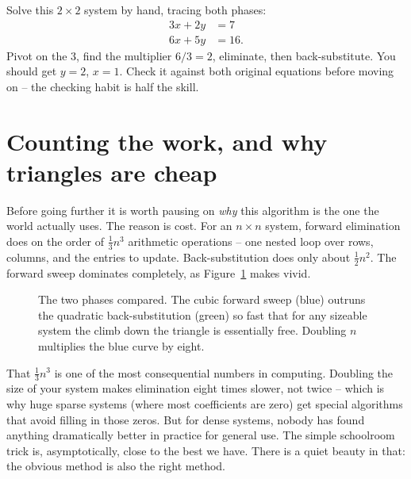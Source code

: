 \begin{labbox}
Solve this $2\times 2$ system by hand, tracing both phases:
\[
\begin{aligned}
3x + 2y &= 7\\
6x + 5y &= 16.
\end{aligned}
\]
Pivot on the $3$, find the multiplier $6/3 = 2$, eliminate, then back-substitute.
You should get $y = 2$, $x = 1$. Check it against both original equations before
moving on -- the checking habit is half the skill.
\end{labbox}

\section{Counting the work, and why triangles are cheap}

Before going further it is worth pausing on \emph{why} this algorithm is the one
the world actually uses. The reason is cost. For an $n\times n$ system, forward
elimination does on the order of $\tfrac13 n^3$ arithmetic operations -- one
nested loop over rows, columns, and the entries to update. Back-substitution
does only about $\tfrac12 n^2$. The forward sweep dominates completely, as
Figure~\ref{ch07:cost} makes vivid.

\begin{figure}[H]
\centering
{}
\caption{The two phases compared. The cubic forward sweep (blue) outruns the
quadratic back-substitution (green) so fast that for any sizeable system the
climb down the triangle is essentially free. Doubling $n$ multiplies the blue
curve by eight.}
\label{ch07:cost}
\end{figure}

\begin{aestheticbox}
That $\tfrac13 n^3$ is one of the most consequential numbers in computing.
Doubling the size of your system makes elimination eight times slower, not twice
-- which is why huge sparse systems (where most coefficients are zero) get
special algorithms that avoid filling in those zeros. But for dense systems,
nobody has found anything dramatically better in practice for general use.
The simple schoolroom trick is, asymptotically, close to the best we have. There
is a quiet beauty in that: the obvious method is also the right method.
\end{aestheticbox}


